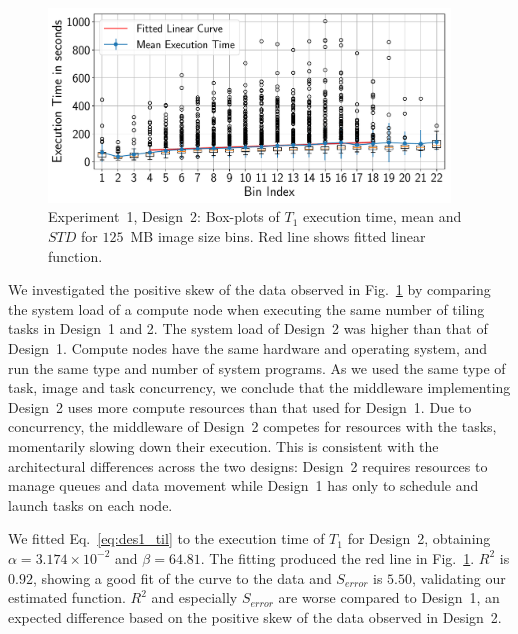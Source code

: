 \begin{figure}[H]
    \centering
    \includegraphics[width=0.95\textwidth]{figures/designs/stage_0_tx_box_des2.pdf}
    \caption{Experiment~1, Design~2: Box-plots of $T_{1}$ execution time, mean and $STD$ for $125$~MB image size bins.
        Red line shows fitted linear function.}\label{fig:stage_1_execution_des2}
\end{figure}


We investigated the positive skew of the data observed in Fig.~\ref{fig:stage_1_execution_des2} by comparing the system load of a compute node when executing the same number of tiling tasks in Design~1 and 2.
The system load of Design~2 was higher than that of Design~1.
Compute nodes have the same hardware and operating system, and run the same type and number of system programs.
As we used the same type of task, image and task concurrency, we conclude that the middleware implementing Design~2 uses more compute resources than that used for Design~1.
Due to concurrency, the middleware of Design~2 competes for resources with the tasks, momentarily slowing down their execution.
This is consistent with the architectural differences across the two designs: Design~2 requires resources to manage queues and data movement while Design~1 has only to schedule and launch tasks on each node.

We fitted Eq.~\ref{eq:des1_til} to the execution time of $T_1$ for Design~2, obtaining $\alpha = 3.174 \times 10^{-2}$ and $\beta = 64.81$.
The fitting produced the red line in Fig.~\ref{fig:stage_1_execution_des2}.
$R^{2}$ is $0.92$, showing a good fit of the curve to the data and $S_{error}$ is $5.50$, validating our estimated function.
$R^2$ and especially $S_{error}$ are worse compared to Design~1, an expected difference based on the positive skew of the data observed in Design~2.


